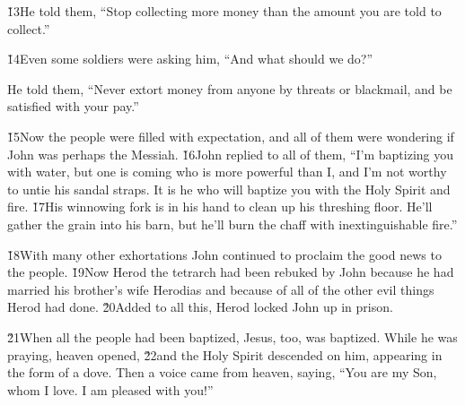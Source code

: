 \v{13}He told them, ``Stop collecting more money than the amount you are told to collect.''

\v{14}Even some soldiers were asking him, ``And what should we do?''

He told them, ``Never extort money from anyone by threats or blackmail, and be satisfied with your pay.''

\v{15}Now the people were filled with expectation, and all of them were wondering if John was perhaps the Messiah. \v{16}John replied to all of them, ``I'm baptizing you with water, but one is coming who is more powerful than I, and I'm not worthy to untie his sandal straps. It is he who will baptize you with the Holy Spirit and fire. \v{17}His winnowing fork is in his hand to clean up his threshing floor. He'll gather the grain into his barn, but he'll burn the chaff with inextinguishable fire.''

\v{18}With many other exhortations John continued to proclaim the good news to the people. \v{19}Now Herod the tetrarch had been rebuked by John because he had married his brother's wife Herodias and because of all of the other evil things Herod had done. \v{20}Added to all this, Herod locked John up in prison.

\v{21}When all the people had been baptized, Jesus, too, was baptized. While he was praying, heaven opened, \v{22}and the Holy Spirit descended on him, appearing in the form of a dove. Then a voice came from heaven, saying, ``You are my Son, whom I love. I am pleased with you!''

